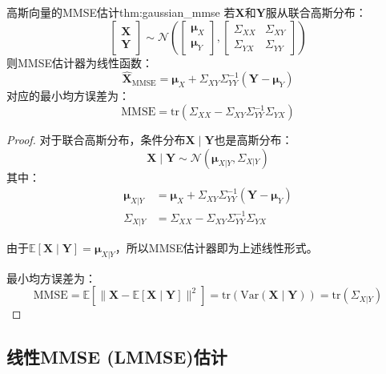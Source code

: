\documentclass[11pt]{article}
\renewcommand{\vec}[1]{\bm{#1}}
\newcommand{\E}{\mathbb{E}}
\newcommand{\Var}{\text{Var}}
\newcommand{\trace}{\text{tr}}
\newcommand{\normal}{\mathcal{N}}
\begin{document}
\begin{theorem}{高斯向量的MMSE估计}{thm:gaussian_mmse}
若$\vec{X}$和$\vec{Y}$服从联合高斯分布：
\begin{equation}
\begin{bmatrix} \vec{X} \\ \vec{Y} \end{bmatrix} \sim \normal\left( 
\begin{bmatrix} \vec{\mu}_X \\ \vec{\mu}_Y \end{bmatrix}, 
\begin{bmatrix} \Sigma_{XX} & \Sigma_{XY} \\ \Sigma_{YX} & \Sigma_{YY} \end{bmatrix}
\right)
\end{equation}
则MMSE估计器为线性函数：
\begin{equation}
\hat{\vec{X}}_{\text{MMSE}} = \vec{\mu}_X + \Sigma_{XY} \Sigma_{YY}^{-1} (\vec{Y} - \vec{\mu}_Y)
\end{equation}
对应的最小均方误差为：
\begin{equation}
\text{MMSE} = \trace(\Sigma_{XX} - \Sigma_{XY} \Sigma_{YY}^{-1} \Sigma_{YX})
\end{equation}
\end{theorem}

\begin{proof}
对于联合高斯分布，条件分布$\vec{X} \mid \vec{Y}$也是高斯分布：
\begin{equation}
\vec{X} \mid \vec{Y} \sim \normal(\vec{\mu}_{X|Y}, \Sigma_{X|Y})
\end{equation}
其中：
\begin{align}
\vec{\mu}_{X|Y} &= \vec{\mu}_X + \Sigma_{XY} \Sigma_{YY}^{-1} (\vec{Y} - \vec{\mu}_Y) \\
\Sigma_{X|Y} &= \Sigma_{XX} - \Sigma_{XY} \Sigma_{YY}^{-1} \Sigma_{YX}
\end{align}

由于$\E[\vec{X} \mid \vec{Y}] = \vec{\mu}_{X|Y}$，所以MMSE估计器即为上述线性形式。

最小均方误差为：
\begin{equation}
\text{MMSE} = \E[\|\vec{X} - \E[\vec{X} \mid \vec{Y}]\|^2] = \trace(\Var(\vec{X} \mid \vec{Y})) = \trace(\Sigma_{X|Y})
\end{equation}
\end{proof}

\subsection{线性MMSE (LMMSE)估计}
\end{document}
